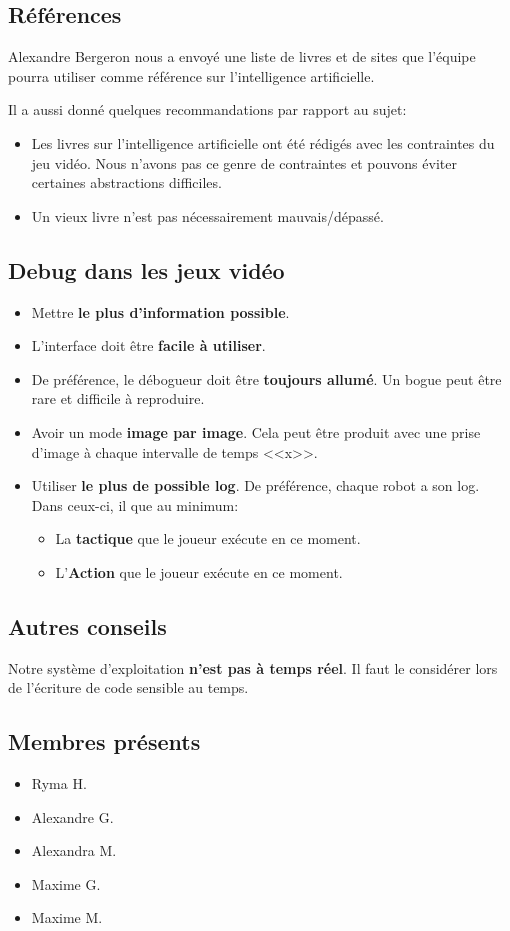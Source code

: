 \documentclass[12pt,letterpaper,twoside]{article}
\begin{document}
\subsection*{Références}
Alexandre Bergeron nous a envoyé une liste de livres et de sites que l'équipe pourra utiliser comme référence sur l'intelligence artificielle.

Il a aussi donné quelques recommandations par rapport au sujet:
\begin{itemize}
\item Les livres sur l'intelligence artificielle ont été rédigés avec les contraintes du jeu vidéo.
Nous n'avons pas ce genre de contraintes et pouvons éviter certaines abstractions difficiles.
\item Un vieux livre n'est pas nécessairement mauvais/dépassé.
\end{itemize}

\subsection*{Debug dans les jeux vidéo}
\begin{itemize}
\item Mettre \textbf{le plus d'information possible}.
\item L'interface doit être \textbf{facile à utiliser}.
\item De préférence, le débogueur doit être \textbf{toujours allumé}.
Un bogue peut être rare et difficile à reproduire.
\item Avoir un mode \textbf{image par image}.
Cela peut être produit avec une prise d'image à chaque intervalle de temps <<x>>.
\item Utiliser \textbf{le plus de possible log}.
De préférence, chaque robot a son log.
Dans ceux-ci, il  que au minimum:
\begin{itemize}
\item La \textbf{tactique} que le joueur exécute en ce moment.
\item L'\textbf{Action} que le joueur exécute en ce moment.
\end{itemize}

\end{itemize}

\subsection*{Autres conseils}
Notre système d'exploitation \textbf{n'est pas à temps réel}.
Il faut le considérer lors de l'écriture de code sensible au temps.

\subsection*{Membres présents}
\begin{itemize}
\item Ryma H.
\item Alexandre G.
\item Alexandra M.
\item Maxime G.
\item Maxime M.
\end{itemize}
\end{document}
